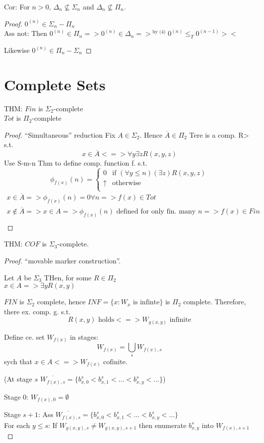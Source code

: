\documentclass[12pt]{article}
\newcommand{\Conj}[1]{\ensuremath{\overline{#1}}}
\begin{document}
\begin{pthm}
Cor: For $n > 0$, $\Delta_n \not\subseteq \Sigma_n$ and $\Delta_n \not\subseteq \Pi_n$.
\begin{proof}
 $0^{(n)} \in \Sigma_n - \Pi_n$ \\
	Ass not: Then $0^{(n)} \in \Pi_n => 0^{(n)} \in \Delta_n 
	=>^{\text{ by (4)}} 0^{(n)} \le_T 0^{(n-1)} ><$

	Likewise $0^{(n)} \in \Pi_n - \Sigma_n$
\end{proof}

\section*{Complete Sets}
THM: $Fin$ is $\Sigma_2$-complete \\
$Tot$ is $\Pi_2$-complete
\begin{proof}
 ``Simultaneous'' reduction
	Fix $ A \in \Sigma_2$. Hence $\Conj{A} \in \Pi_2$
	Tere is a comp. R> s.t.
\[
 x \in \Conj{A} <=> \forall y \exists z R(x,y,z)
\]
Use S-m-n Thm to define comp. function f. s.t. 
\[
 \phi_{f(x)}(n) = \begin{cases}
                   0		&\text{if } (\forall y \le n) (\exists z) R(x,y,z) \\
                   \uparrow	&\text{otherwise}\\
                  \end{cases}
\]
\begin{align*}
 x \in \Conj{A} => \phi_{f(x)}(n) = 0 \forall n => f(x) \in Tot \\
 x \not\in \Conj{A} => x \in A => 
\phi_{f(x)}(n) \text{ defined for only fin. many $n$} => f(x) \in Fin \\
\end{align*}
\end{proof}

THM: $COF$ is $\Sigma_3$-complete.
\begin{proof} ``movable marker construction''.

Let $A$ be $\Sigma_3$  THen, for some $R \in \Pi_2$ \\
$x\in A=> \exists y R(x,y)$

$FIN$ is $\Sigma_2$ complete, hence $INF = \{x : W_x \text{ is infinte} \}$ is
$\Pi_2$ complete.  Therefore, there ex. comp. g. s.t.
\[
 R(x,y) \text{ holds} <=> W_{g(x,y)} \text{ infinite}
\]

Define ce. set $W_{f(x)}$ in stages:
\[
 W_{f(x)} = \bigcup_s W_{f(x),s}
\]
sych that
$x \in A <=> W_{f(x)} \text{ cofinite.}$

(At stage $s$
$
 \Conj{W_{f(x),s}} = \{ b^s_{x,0} < b^s_{x,1} < \ldots < b^s_{x,y} < \ldots \}
$)

Stage 0: $W_{f(x),0} = \emptyset$

Stage $s+1$:  Ass  $\Conj{W_{f(x),s}} = \{ b^s_{x,0} < b^s_{x,1} < \ldots < b^s_{x,y} < \ldots \}$ \\
For each $y \le s$:
If $W_{g(x,y),s} \ne W_{g(x,y),s+1}$
then enumerate $b^s_{x,y}$ into $W_{f(x),s+1}$


\end{proof}



\end{pthm}
\end{document}
